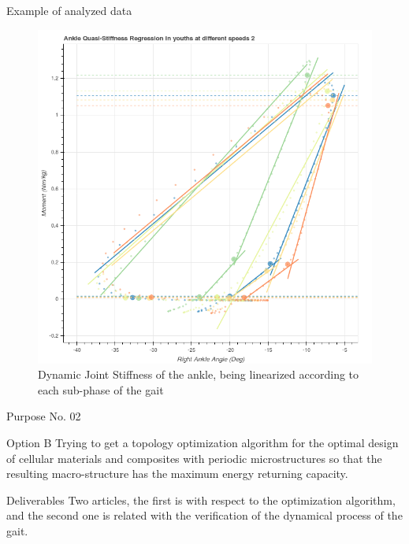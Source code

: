 \documentclass[10pt]{beamer}
\begin{document}
\begin{frame}{Example of analyzed data}
\begin{figure}[H]
\begin{centering}
\includegraphics[scale=0.25]{quasistiffness.png}
\par\end{centering}

\caption{\label{fig:N=1} Dynamic Joint Stiffness of the ankle, being linearized according to each sub-phase of the gait}

\end{figure}
\end{frame}

\begin{frame}{Purpose No. 02}
	\begin{block}{Option B}
	Trying to get a topology optimization algorithm for the optimal design of cellular materials and composites with periodic microstructures so that the resulting macro-structure has the maximum energy returning capacity. 
	\end{block}
	\begin{exampleblock}{Deliverables}
	Two articles, the first is with respect to the optimization algorithm, and the second one is related with the verification of the dynamical process of the gait.
	\end{exampleblock}
\end{frame}
\end{document}

